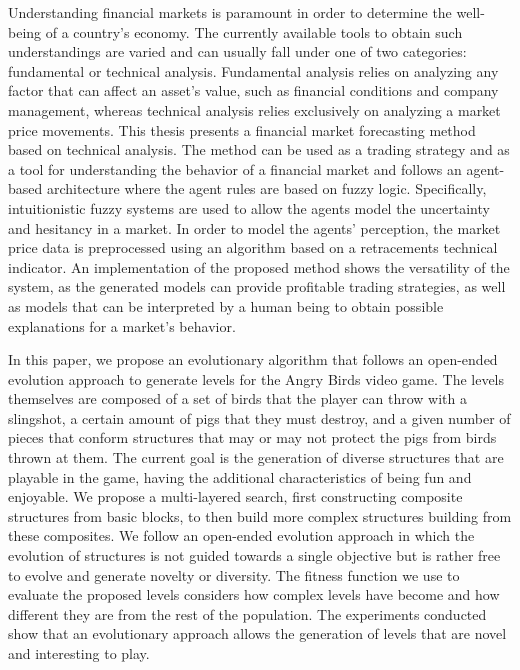 Understanding financial markets is paramount in order to determine the
well-being of a country's economy. The currently available tools to obtain such
understandings are varied and can usually fall under one of two categories:
fundamental or technical analysis. Fundamental analysis relies on analyzing any
factor that can affect an asset's value, such as financial conditions and
company management, whereas technical analysis relies exclusively on analyzing a
market price movements. This thesis presents a financial market forecasting
method based on technical analysis. The method can be used as a trading strategy
and as a tool for understanding the behavior of a financial market and follows
an agent-based architecture where the agent rules are based on fuzzy logic.
Specifically, intuitionistic fuzzy systems are used to allow the agents model
the uncertainty and hesitancy in a market. In order to model the agents'
perception, the market price data is preprocessed using an algorithm based on a
retracements technical indicator. An implementation of the proposed method shows
the versatility of the system, as the generated models can provide profitable
trading strategies, as well as models that can be interpreted by a human being
to obtain possible explanations for a market's behavior.



In this paper, we propose an evolutionary algorithm that follows an open-ended
evolution approach to generate levels for the Angry Birds video game. The levels
themselves are composed of a set of birds that the player can throw with a
slingshot, a certain amount of pigs that they must destroy, and a given number
of pieces that conform structures that may or may not protect the pigs from
birds thrown at them. The current goal is the generation of diverse structures
that are playable in the game, having the additional characteristics of being
fun and enjoyable. We propose a multi-layered search, first constructing
composite structures from basic blocks, to then build more complex structures
building from these composites. We follow an open-ended evolution approach in
which the evolution of structures is not guided towards a single objective but
is rather free to evolve and generate novelty or diversity. The fitness function
we use to evaluate the proposed levels considers how complex levels have become
and how different they are from the rest of the population. The experiments
conducted show that an evolutionary approach allows the generation of levels
that are novel and interesting to play.